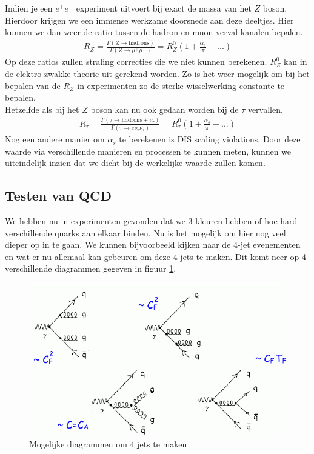 \documentclass[../main.tex]{subfiles}
\begin{document}
Indien je een $e^+e^-$ experiment uitvoert bij exact de massa van het $Z$ boson. Hierdoor krijgen we een immense werkzame doorsnede aan deze deeltjes. Hier kunnen we dan weer de ratio tussen de hadron en muon verval kanalen bepalen.
\begin{equation}
    \begin{aligned}
        \label{eq:hadr_z_boson}
        R_Z = \frac{\Gamma(Z\rightarrow \text{hadrons})}{\Gamma(Z\rightarrow \mu^+\mu^-)} = R_Z^0(1+ \frac{\alpha_s}{\pi} + ...)
    \end{aligned}
\end{equation}
Op deze ratios zullen straling correcties die we niet kunnen berekenen. $R_Z^0$ kan in de elektro zwakke theorie uit gerekend worden. Zo is het weer mogelijk om bij het bepalen van de $R_Z$ in experimenten zo de sterke wisselwerking constante te bepalen.\\
Hetzelfde als bij het $Z$ boson kan nu ook gedaan worden bij de $\tau$ vervallen.
\begin{equation}
    \begin{aligned}
        \label{eq:hadr_tau}
        R_\tau = \frac{\Gamma(\tau\rightarrow \text{hadrons}+\nu_\tau)}{\Gamma(\tau\rightarrow e\nu_e\nu_\tau)} = R_\tau^0(1+ \frac{\alpha_s}{\pi} + ...)
    \end{aligned}
\end{equation}
Nog een andere manier om $\alpha_s$ te berekenen is DIS scaling violations. Door deze waarde via verschillende manieren en processen te kunnen meten, kunnen we uiteindelijk inzien dat we dicht bij de werkelijke waarde zullen komen.

\subsection{Testen van QCD}%
\label{sub:testen_van_qcd}

We hebben nu in experimenten gevonden dat we 3 kleuren hebben of hoe hard verschillende quarks aan elkaar binden. Nu is het mogelijk om hier nog veel dieper op in te gaan. We kunnen bijvoorbeeld kijken naar de 4-jet evenementen en wat er nu allemaal kan gebeuren om deze 4 jets te maken. Dit komt neer op 4 verschillende diagrammen gegeven in figuur \ref{fig:4jets}.

\begin{figure}[h]
    \centering
    \includegraphics[width=0.8\linewidth]{QCD/4jets.png}
    \caption{Mogelijke diagrammen om 4 jets te maken}%
    \label{fig:4jets}
\end{figure}
\end{document}
